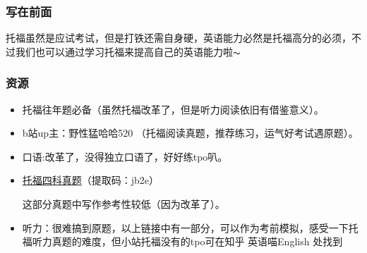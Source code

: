 \documentclass[zihao=-4,fontset=none]{Beautybook-CN}
\begin{document}
\subsubsection{写在前面}
托福虽然是应试考试，但是打铁还需自身硬，英语能力必然是托福高分的必须，不过我们也可以通过学习托福来提高自己的英语能力啦$\thicksim$

\subsubsection{资源}
\begin{itemize}
\item 托福往年题必备（虽然托福改革了，但是听力阅读依旧有借鉴意义）。
\item b站up主：野性猛哈哈520 （托福阅读真题，推荐练习，运气好考试遇原题）。
\item 口语:改革了，没得独立口语了，好好练tpo叭。
\item \href{https://pan.baidu.com/s/10RPth1ll1xcbwxcw_V7Oaw}{托福四科真题}（提取码：jb2e）

\begin{theorem}
    这部分真题中写作参考性较低（因为改革了）。
\end{theorem}
\item 听力：很难搞到原题，以上链接中有一部分，可以作为考前模拟，感受一下托福听力真题的难度，但小站托福没有的tpo可在知乎 英语喵English 处找到
\end{itemize}
\end{document}

